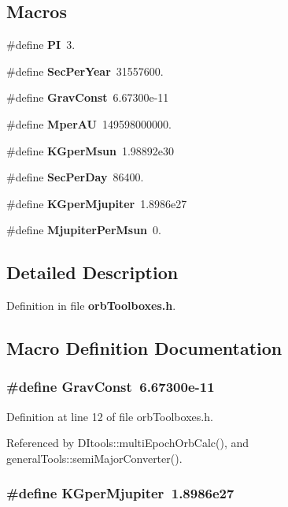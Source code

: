 \subsection*{Macros}
\begin{DoxyCompactItemize}
\item 
\#define {\bf P\-I}~3.
\item 
\#define {\bf Sec\-Per\-Year}~31557600.
\item 
\#define {\bf Grav\-Const}~6.\-67300e-\/11
\item 
\#define {\bf Mper\-A\-U}~149598000000.
\item 
\#define {\bf K\-Gper\-Msun}~1.\-98892e30
\item 
\#define {\bf Sec\-Per\-Day}~86400.
\item 
\#define {\bf K\-Gper\-Mjupiter}~1.\-8986e27
\item 
\#define {\bf Mjupiter\-Per\-Msun}~0.
\end{DoxyCompactItemize}


\subsection{Detailed Description}


Definition in file {\bf orb\-Toolboxes.\-h}.



\subsection{Macro Definition Documentation}
\subsubsection[{Grav\-Const}]{\setlength{\rightskip}{0pt plus 5cm}\#define Grav\-Const~6.\-67300e-\/11}\label{orb_toolboxes_8h_acb874917124e80c2cc3093224267270a}


Definition at line 12 of file orb\-Toolboxes.\-h.



Referenced by D\-Itools\-::multi\-Epoch\-Orb\-Calc(), and general\-Tools\-::semi\-Major\-Converter().

\subsubsection[{K\-Gper\-Mjupiter}]{\setlength{\rightskip}{0pt plus 5cm}\#define K\-Gper\-Mjupiter~1.\-8986e27}\label{orb_toolboxes_8h_ab06efcd5ace405dec01fbf433aab9db1}


